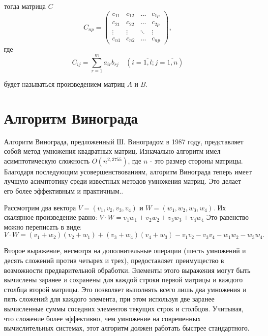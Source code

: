 тогда матрица $C$
\begin{equation}
	C_{np} = \begin{pmatrix}
		c_{11} & c_{12} & \ldots & c_{1p}\\
		c_{21} & c_{22} & \ldots & c_{2p}\\
		\vdots & \vdots & \ddots & \vdots\\
		c_{n1} & c_{n2} & \ldots & c_{np}
	\end{pmatrix},
\end{equation}
где
\begin{equation}
	\label{eq:M}
	C_{ij} =
	\sum_{r=1}^{m} a_{ir}b_{rj} \quad (i=\overline{1,l}; j=\overline{1,n})
\end{equation}

будет называться произведением матриц $A$ и $B$.

\section{Алгоритм Винограда}

Алгоритм Винограда, предложенный Ш. Виноградом в 1987 году, представляет собой метод умножения квадратных матриц. Изначально алгоритм имел асимптотическую сложность $O(n^{2,3755})$, где $n$ - это размер стороны матрицы. 
Благодаря последующим усовершенствованиям, алгоритм Винограда теперь имеет лучшую асимптотику среди известных методов умножения матриц. 
Это делает его более эффективным и практичным.\cite{vinograd}.

Рассмотрим два вектора $V = (v_1, v_2, v_3, v_4)$ и $W = (w_1, w_2, w_3, w_4)$. Их скалярное произведение равно: $V \cdot W = v_1w_1 + v_2w_2 + v_3w_3 + v_4w_4$
Это равенство можно переписать в виде:
\begin{equation}
	\label{for:new}
	V \cdot W = (v_1 + w_2)(v_2 + w_1) + (v_3 + w_4)(v_4 + w_3) - v_1v_2 - v_3v_4 - w_1w_2 - w_3w_4.
\end{equation}

Второе выражение, несмотря на дополнительные операции (шесть умножений и десять сложений против четырех и трех), предоставляет преимущество в возможности предварительной обработки. 
Элементы этого выражения могут быть вычислены заранее и сохранены для каждой строки первой матрицы и каждого столбца второй матрицы. 
Это позволяет выполнять всего лишь два умножения и пять сложений для каждого элемента, при этом используя две заранее вычисленные суммы соседних элементов текущих строк и столбцов. 
Учитывая, что сложение более эффективно, чем умножение на современных вычислительных системах, этот алгоритм должен работать быстрее стандартного.

